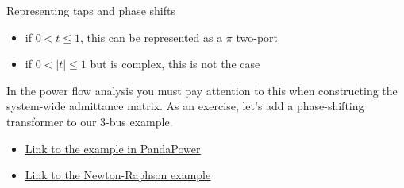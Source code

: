 \begin{frame}[allowframebreaks]{Representing taps and phase shifts}
 \newpage
\begin{itemize}
    \item if $ 0 < t \leq 1$, this can be represented as a $\pi$ two-port
    \item if $ 0 < |t| \leq 1$ but is complex, this is not the case
\end{itemize}

In the power flow analysis you must \alert{pay attention to this when constructing the system-wide admittance matrix.}
As an exercise, let's add a phase-shifting transformer to our 3-bus example.

\begin{itemize}
    \item \href{https://github.com/bcornelusse/ELEC0447-analysis-power-systems/blob/master/notebooks/PF_3_transformer_gen_limits_pandapower.ipynb}{\underline{Link to the example in PandaPower}}
    \item \href{https://github.com/bcornelusse/ELEC0447-analysis-power-systems/blob/master/notebooks/power_flow_3-bus-transformer_and_gen_limits_Newton-Raphson.py}{\underline{Link to the Newton-Raphson example}}
\end{itemize}

\end{frame}